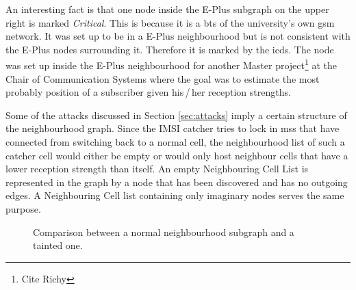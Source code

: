 An interesting fact is that one node inside the E-Plus subgraph on the upper right is marked \emph{Critical}.
This is because it is a \gls{bts} of the university's own \gls{gsm} network.
It was set up to be in a E-Plus neighbourhood but is not consistent with the E-Plus nodes surrounding it.
Therefore it is marked by the \gls{icds}.
The node was set up inside the E-Plus neighbourhood for another Master project\footnote{Cite Richy} at the Chair of Communication Systems where the goal was to estimate the most probably position of a subscriber given his\,/\,her reception strengths.

Some of the attacks discussed in Section \ref{sec:attacks} imply a certain structure of the neighbourhood graph.
Since the IMSI catcher tries to lock in \glspl{ms} that have connected from switching back to a normal cell, the neighbourhood list of such a catcher cell would either be empty or would only host neighbour cells that have a lower reception strength than itself.
An empty Neighbouring Cell List is represented in the graph by a node that has been discovered and has no outgoing edges.
A Neighbouring Cell list containing only imaginary nodes serves the same purpose.
\begin{figure}
\centering
{}
\caption{Comparison between a normal neighbourhood subgraph and a tainted one.}
\label{fig:structure_comparison}
\end{figure}
